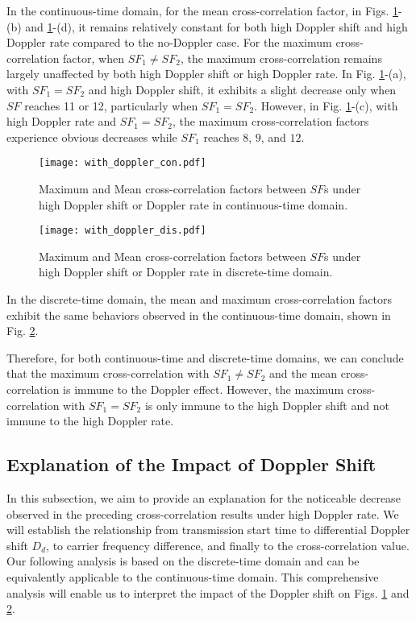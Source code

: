 \documentclass{IEEEtaes}
\theoremstyle{plain}
\begin{document}
In the continuous-time domain, for the mean cross-correlation factor, in Figs. \ref{with_doppler_con}-(b) and \ref{with_doppler_con}-(d), it remains relatively constant for both high Doppler shift and high Doppler rate compared to the no-Doppler case. 
For the maximum cross-correlation factor, when $SF_1 \neq SF_2$, the maximum cross-correlation remains largely unaffected by both high Doppler shift or high Doppler rate. In Fig. \ref{with_doppler_con}-(a), with $SF_1 = SF_2$ and high Doppler shift, it exhibits a slight decrease only when $SF$ reaches 11 or 12, particularly when $SF_1 = SF_2$. However, in Fig. \ref{with_doppler_con}-(c), with high Doppler rate and $SF_1 = SF_2$, the maximum cross-correlation factors experience obvious decreases while $SF_1$ reaches $8$, $9$, and $12$. 
\begin{figure}[ht]
  \centering
  \texttt{[image: with\_doppler\_con.pdf]}
  \caption{Maximum and Mean cross-correlation factors between $SF$s under high Doppler shift or Doppler rate in continuous-time domain.}
  \label{with_doppler_con}
\end{figure}
\begin{figure}[ht]
  \centering
  \texttt{[image: with\_doppler\_dis.pdf]}
  \caption{Maximum and Mean cross-correlation factors between $SF$s under high Doppler shift or Doppler rate in discrete-time domain.}
  \label{with_doppler_dis}
\end{figure}

In the discrete-time domain, the mean and maximum cross-correlation factors exhibit the same behaviors observed in the continuous-time domain, shown in Fig. \ref{with_doppler_dis}.

Therefore, for both continuous-time and discrete-time domains, we can conclude that the maximum cross-correlation with $SF_1 \neq SF_2$ and the mean cross-correlation is immune to the Doppler effect. However, the maximum cross-correlation with $SF_1 = SF_2$ is only immune to the high Doppler shift and not immune to the high Doppler rate.

\subsection{Explanation of the Impact of Doppler Shift}
In this subsection, we aim to provide an explanation for the noticeable decrease observed in the preceding cross-correlation results under high Doppler rate. We will establish the relationship from transmission start time to differential Doppler shift $D_d$, to carrier frequency difference, and finally to the cross-correlation value. Our following analysis is based on the discrete-time domain and can be equivalently applicable to the continuous-time domain. This comprehensive analysis will enable us to interpret the impact of the Doppler shift on Figs. \ref{with_doppler_con} and \ref{with_doppler_dis}.
\end{document}
